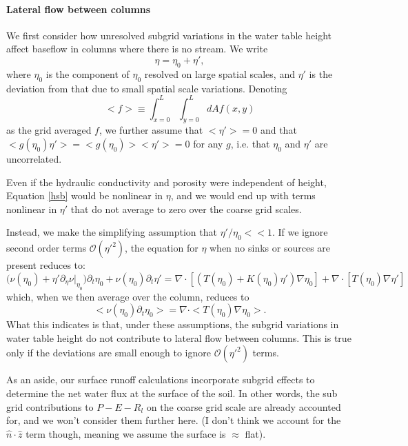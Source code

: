 \documentclass[twoside,10pt]{report}
\begin{document}
\paragraph{Lateral flow between columns}
We first consider how unresolved subgrid variations in the water table height affect baseflow in columns where there is no stream. We write
\begin{equation}
    \eta = \eta_0 +\eta',
\end{equation}
where $\eta_0$ is the component of $\eta_0$ resolved on large spatial scales, and $\eta'$ is the deviation from that due to small spatial scale variations. Denoting
\begin{equation}
    <f> \equiv \int_{x=0}^L \int_{y=0}^L dA f(x,y) 
\end{equation}
as the grid averaged $f$, we further assume that $<\eta'>=0$ and that \\
$<g(\eta_0) \eta'> = <g(\eta_0)><\eta'> = 0$ for any $g$, i.e. that $\eta_0$ and $\eta'$ are uncorrelated. 

Even if the hydraulic conductivity and porosity were independent of height, Equation \eqref{hsb} would be nonlinear in $\eta$, and we would end up with terms nonlinear in $\eta'$ that do not average to zero over the coarse grid scales.  

Instead, we make the simplifying assumption that $\eta'/\eta_0<<1$. If we ignore second order terms $\mathcal{O}(\eta'^2)$, the equation for $\eta$ when no sinks or sources are present reduces to:
\begin{equation}
    \bigg(\nu(\eta_0)+\eta'\partial_\eta\nu|_{\eta_0}\bigg)\partial_t \eta_0 + \nu(\eta_0)\partial_t \eta' = \nabla \cdot [(T(\eta_0)+K(\eta_0) \eta') \nabla \eta_0] + \nabla \cdot [T(\eta_0)\nabla \eta']
\end{equation}
which, when we then average over the column, reduces to
\begin{equation}
    <\nu(\eta_0)\partial_t \eta_0>  = \nabla \cdot <T(\eta_0)\nabla \eta_0>.
\end{equation}
What this indicates is that, under these assumptions, the subgrid variations in water table height do not contribute to lateral flow between columns. This is true only if the deviations are small enough to ignore $\mathcal{O}(\eta'^2)$ terms.

As an aside, our surface runoff calculations incorporate subgrid effects to determine the net water flux at the surface of the soil. In other words, the sub grid contributions to $P-E-R_l$ on the coarse grid scale are already accounted for, and we won't consider them further here. (I don't think we account for the $\hat{n} \cdot \hat{z}$ term though, meaning we assume the surface is $\approx$ flat).
\end{document}
